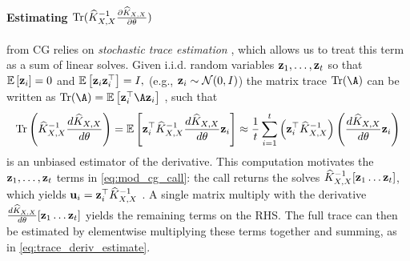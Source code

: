 \paragraph{Estimating $\tr{ \trainK^{-1} \frac{\partial \trainK}{\partial \theta} }$}
from CG relies on \emph{stochastic trace estimation} \cite{avron2011randomized,fitzsimons2016improved,hutchinson1990stochastic}, which allows us to treat this term as a sum of linear solves.
Given i.i.d. random variables $\mathbf{z}_1, \ldots, \mathbf{z}_t$ so that $\operatorname*{\mathbb{E}} \left[ \mathbf{z}_i \right]=0$ and $\operatorname*{\mathbb{E}} \left[ \mathbf{z}_i \mathbf{z}_i^{\top} \right]=I,
$ (e.g., $\mathbf{z}_{i} \sim \mathcal{N}(0, I)$)
the matrix trace $\tr{\A}$ can be written as
$
  \tr{\A} = \Ev{\bz_i^\top \A\bz_i}
$
, such that
%
\begin{equation}
  \label{eq:trace_deriv_estimate}
  \tr{\trainK^{-1}\frac{d\trainK}{d\theta}}  = \Ev{\bz_i^\top  \trainK^{-1}\frac{d\trainK}{d\theta} \bz_i} \approx \frac{1}{t}\sum_{i=1}^{t}\left(\bz_{i}^\top \trainK^{-1}\right)\left(\frac{d\trainK}{d\theta}\bz_{i} \right)
\end{equation}
%
is an unbiased estimator of the derivative. This computation motivates the $\mathbf{z}_1, \ldots, \mathbf{z}_t$ terms in \eqref{eq:mod_cg_call}:
the \mcgacro{} call returns the solves $\widehat{K}_{X,X}^{-1}[\mathbf{z}_1 \ldots \mathbf{z}_t]$, which yields $\mathbf{u}_i=\mathbf{z}_{i}^\top \widehat{K}_{X,X}^{-1}$ . A single matrix multiply with the derivative $\frac{d\widehat{K}_{X,X}}{d\theta}[\mathbf{z}_1 \ldots \mathbf{z}_t]$ yields the remaining terms on the RHS. The full trace can then be estimated by elementwise multiplying these terms together and summing, as in
\eqref{eq:trace_deriv_estimate}.

